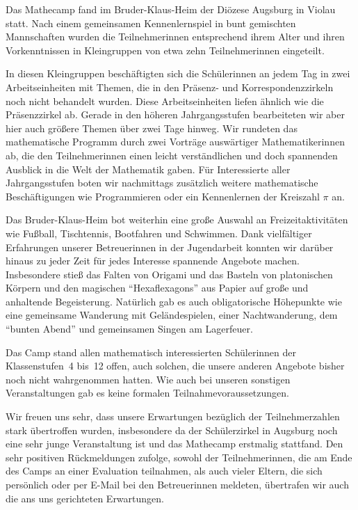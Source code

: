 \documentclass[12pt]{zettel}
\newcommand{\twopics}[2]{%
  \begin{figure}[b]%
    \vspace*{0.5cm}%
    \makebox[\textwidth][c]{%
      \texttt{[image: impressionen/\#1]}%
      \hspace*{1cm}%
      \texttt{[image: impressionen/\#2]}%
    }%
    \vspace*{-1cm}%
  \end{figure}
}
\begin{document}
Das Mathecamp fand im Bruder-Klaus-Heim der Diözese Augsburg in Violau statt. Nach einem gemeinsamen Kennenlernspiel in bunt gemischten Mannschaften wurden die Teilnehmerinnen
entsprechend ihrem Alter und ihren Vorkenntnissen in Kleingruppen von etwa zehn Teilnehmerinnen eingeteilt.

In diesen Kleingruppen beschäftigten sich die Schülerinnen an jedem Tag
in zwei Arbeitseinheiten mit Themen, die in den Präsenz- und Korrespondenzzirkeln noch nicht behandelt wurden. Diese Arbeitseinheiten liefen ähnlich wie die Präsenzzirkel ab.
Gerade in den höheren Jahrgangsstufen bearbeiteten wir aber hier auch größere Themen über zwei Tage hinweg. Wir rundeten das mathematische
Programm durch zwei Vorträge auswärtiger Mathematikerinnen ab, die den Teilnehmerinnen einen leicht verständlichen und doch
spannenden Ausblick in die Welt der Mathematik gaben. Für Interessierte aller Jahrgangsstufen boten wir nachmittags zusätzlich weitere mathematische Beschäftigungen wie Programmieren
oder ein Kennenlernen der Kreiszahl $\pi$ an.

\twopics{klein-07}{klein-02}

Das Bruder-Klaus-Heim bot weiterhin eine große Auswahl an Freizeitaktivitäten wie Fußball, Tischtennis, Bootfahren und Schwimmen. Dank vielfältiger Erfahrungen unserer Betreuerinnen
in der Jugendarbeit konnten wir darüber hinaus zu jeder Zeit für jedes Interesse spannende Angebote machen. Insbesondere stieß das Falten von Origami und das Basteln von platonischen
Körpern und den magischen "`Hexaflexagons"' aus Papier auf große und anhaltende Begeisterung. Natürlich gab es auch obligatorische Höhepunkte wie eine gemeinsame
Wanderung mit Geländespielen, einer Nachtwanderung, dem "`bunten Abend"' und gemeinsamen Singen am Lagerfeuer.

Das Camp stand allen mathematisch interessierten Schülerinnen der
Klassenstufen~4 bis~12 offen, auch solchen, die unsere anderen Angebote bisher
noch nicht wahrgenommen hatten. Wie auch bei unseren sonstigen Veranstaltungen
gab es keine formalen Teilnahmevoraussetzungen.

Wir freuen uns sehr, dass unsere Erwartungen bezüglich der Teilnehmerzahlen stark übertroffen wurden, insbesondere da der Schülerzirkel in Augsburg noch eine sehr junge
Veranstaltung ist und das Mathecamp erstmalig stattfand. Den sehr positiven Rückmeldungen zufolge, sowohl der Teilnehmerinnen, die am Ende des Camps an einer Evaluation
teilnahmen, als auch vieler Eltern, die sich persönlich oder per E-Mail bei den Betreuerinnen meldeten, übertrafen wir auch die ans uns gerichteten Erwartungen.
\end{document}

